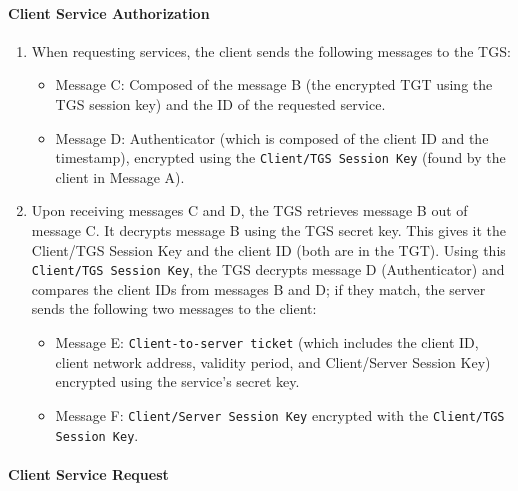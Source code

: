 \paragraph*{Client Service Authorization}
\begin{enumerate}
  \item When requesting services, the client sends the following messages to the TGS:
        \begin{itemize}
          \item Message C: Composed of the message B (the encrypted TGT using the TGS session key) and the ID of the requested service.
          \item Message D: Authenticator (which is composed of the client ID and the timestamp), encrypted using the \texttt{Client/TGS Session Key} (found by the client in Message A).
        \end{itemize}
  \item Upon receiving messages C and D, the TGS retrieves message B out of message C. It decrypts message B using the TGS secret key. This gives it the Client/TGS Session Key and the client ID (both are in the TGT). Using this \texttt{Client/TGS Session Key}, the TGS decrypts message D (Authenticator) and compares the client IDs from messages B and D; if they match, the server sends the following two messages to the client:

        \begin{itemize}
          \item Message E: \texttt{Client-to-server ticket} (which includes the client ID, client network address, validity period, and Client/Server Session Key) encrypted using the service's secret key.
          \item Message F: \texttt{Client/Server Session Key} encrypted with the \texttt{Client/TGS Session Key}.
        \end{itemize}
\end{enumerate}



\paragraph*{Client Service Request}

